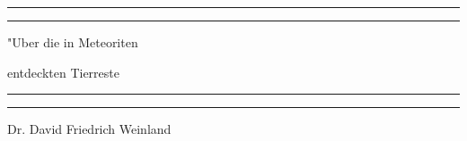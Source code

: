 \documentclass[a4paper, 11pt, oneside]{article}
\begin{document}
\frakfamily
\renewcommand{\contentsname}{
\frakfamily{Inhaltsverzeichnis}
}
\let\origcftsecfont\cft
\let\origcftsecpagefont\cftsecpagefont
\let\origcftsecafterpnum\cftsecafterpnum
\renewcommand{\cftsecpagefont}{\frakfamily{\origcftsecpagefont}}
\renewcommand{\cftsecafterpnum}{\frakfamily{\origcftsecafterpnum}}
\let\origcftsubsecpagefont\cftsubsecpagefont
\let\origcftsubsecafterpnum\cftsubsecafterpnum
\renewcommand{\cftsubsecpagefont}{\frakfamily{\origcftsubsecpagefont}}
\renewcommand{\cftsubsecafterpnum}{\frakfamily{\origcftsubsecafterpnum}}
\let\origcftsubsubsecpagefont\cftsubsubsecpagefont
\let\origcftsubsubsecafterpnum\cftsubsubsecafterpnum
\renewcommand{\cftsubsubsecpagefont}{\frakfamily{\origcftsubsubsecpagefont}}
\renewcommand{\cftsubsubsecafterpnum}{\frakfamily{\origcftsubsubsecafterpnum}}
\begin{titlepage} %
	\centering %
	\scshape %

	
	\rule{\textwidth}{1.6pt}\vspace*{-\baselineskip}\vspace*{2pt} %
	\rule{\textwidth}{0.4pt} %
	
	\vspace{1.5\baselineskip} %
	
	{\Huge "Uber die in Meteoriten}
	
	\vspace{1.2\baselineskip}
	
	{\Huge entdeckten Tierreste}
	
	\vspace{1\baselineskip} %

	\rule{\textwidth}{0.4pt}\vspace*{-\baselineskip}\vspace{3.2pt} %
	\rule{\textwidth}{1.6pt} %
	
	\vspace{1\baselineskip} %
	
	
	{\Large Dr. David Friedrich Weinland} %
	

\end{titlepage}
\end{document}
